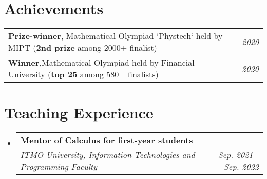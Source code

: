 \documentclass[letterpaper,10pt]{article}
\makeatletter
\newcommand{\resumeSubheading}[4]{
    \vspace{-1pt}\item
        \begin{tabular*}{0.97\textwidth}{l@{\extracolsep{\fill}}r}
            \textbf{#3} & \textcolor{mygray}{#2} \\
            \textit{\small#1} & \textcolor{mygray}{\textit{\small #4}} \\
        \end{tabular*}\vspace{-5pt}
}
\newcommand{\resumeSubHeadingListStart}{\begin{itemize}[leftmargin=*]}
\newcommand{\resumeSubHeadingListEnd}{\end{itemize}}
\makeatother
\begin{document}
\vspace{-1pt}

\section{Achievements}
    \resumeSubHeadingListStart
        \begin{tabular}{ll}
            \textbf{Prize-winner}, \quad Mathematical Olympiad `Phystech` held by MIPT (\textbf{2nd prize} among 2000+ finalist) & \quad\quad\quad\quad\quad\quad\quad\quad \textit{\small 2020}\\
            \textbf{Winner},\quad\quad\quad\quad Mathematical Olympiad held by Financial University (\textbf{top 25} among 580+ finalists) & \quad\quad\quad\quad\quad\quad\quad\quad \textit{\small 2020} 
        \end{tabular}
    \resumeSubHeadingListEnd


\vspace{0.005pt}
\vspace{-1pt}

\section{Teaching Experience}
    \resumeSubHeadingListStart
        \resumeSubheading
            {ITMO University, Information Technologies and Programming Faculty}{}
            {Mentor of \textbf{Calculus} for first-year students}{Sep. 2021 - Sep. 2022}
  \resumeSubHeadingListEnd



    
\end{document}
